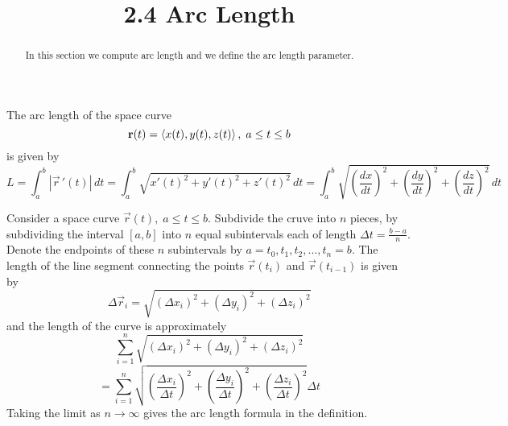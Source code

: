 \documentclass[handout]{ximera}
\title{2.4 Arc Length}
\begin{document}
\begin{abstract}
In this section we compute arc length and we define the arc length parameter.
\end{abstract}

\maketitle


\begin{definition}
The arc length of the space curve
\[
\mathbf r(t) = \left\langle x(t), y(t), z(t)\right\rangle, \; a \leq t \leq b
\]
is given by
\[
L = \int_a^b |\vec r\,'(t)|\, dt = \int_a^b \sqrt{x'(t)^2 + y'(t)^2 +z'(t)^2}\, dt = \int_a^b \sqrt{\left(\frac{dx}{dt}\right)^2 + \left(\frac{dy}{dt}\right)^2 +\left(\frac{dz}{dt}\right)^2}\, dt
\]
\end{definition}


Consider a space curve $\vec r(t), \; a \leq t \leq b$.  Subdivide the cruve into $n$ pieces, by subdividing the interval $[a, b]$ into $n$ equal 
subintervals each of length $\Delta t = \frac{b-a}{n}$. Denote the endpoints of these $n$ subintervals by $a = t_0, t_1, t_2, ..., t_n = b$.
The length of the line segment connecting the points $\vec r(t_i)$ and $\vec r(t_{i-1})$ is given by
\[
\Delta \vec r_i = \sqrt{(\Delta x_i) ^2 + (\Delta y_i)^2 + (\Delta z_i)^2}
\]
and the length of the curve is approximately
\[
\sum_{i = 1}^n \sqrt{(\Delta x_i) ^2 + (\Delta y_i)^2 + (\Delta z_i)^2}
\]
\[
= \sum_{i = 1}^n \sqrt{\left(\frac{\Delta x_i}{\Delta t}\right)^2 + \left(\frac{\Delta y_i}{\Delta t}\right)^2 + \left(\frac{\Delta z_i}{\Delta t}\right)^2} \Delta t
\]
Taking the limit as $n \to \infty$ gives the arc length formula in the definition.
\end{document}
